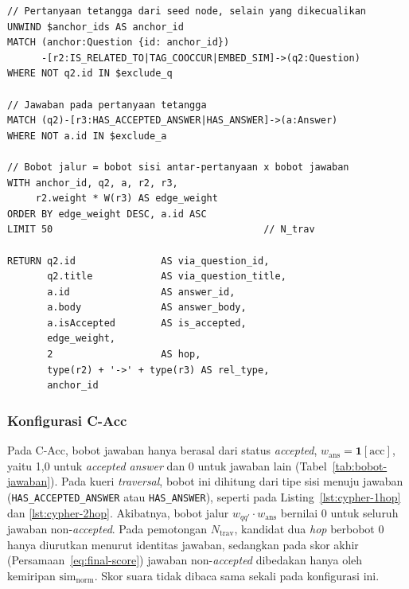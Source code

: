 \begin{lstlisting}[caption={Kueri Cypher \emph{traversal} dua \emph{hop} pada Kondisi C. Bobot jalur adalah bobot sisi antar-pertanyaan dikalikan bobot jawaban \texttt{W(r3)}.}, label={lst:cypher-2hop}, frame=single, captionpos=t, language={}, basicstyle=\ttfamily\scriptsize]
// Pertanyaan tetangga dari seed node, selain yang dikecualikan
UNWIND $anchor_ids AS anchor_id
MATCH (anchor:Question {id: anchor_id})
      -[r2:IS_RELATED_TO|TAG_COOCCUR|EMBED_SIM]->(q2:Question)
WHERE NOT q2.id IN $exclude_q

// Jawaban pada pertanyaan tetangga
MATCH (q2)-[r3:HAS_ACCEPTED_ANSWER|HAS_ANSWER]->(a:Answer)
WHERE NOT a.id IN $exclude_a

// Bobot jalur = bobot sisi antar-pertanyaan x bobot jawaban
WITH anchor_id, q2, a, r2, r3,
     r2.weight * W(r3) AS edge_weight
ORDER BY edge_weight DESC, a.id ASC
LIMIT 50                                     // N_trav

RETURN q2.id               AS via_question_id,
       q2.title            AS via_question_title,
       a.id                AS answer_id,
       a.body              AS answer_body,
       a.isAccepted        AS is_accepted,
       edge_weight,
       2                   AS hop,
       type(r2) + '->' + type(r3) AS rel_type,
       anchor_id
\end{lstlisting}

\subsubsection{Konfigurasi C-Acc}
\label{subsubsec:implementasi-c-acc}

Pada C-Acc, bobot jawaban hanya berasal dari status \emph{accepted}, $w_{\mathrm{ans}}=\mathbf{1}[\mathrm{acc}]$, yaitu 1,0 untuk \emph{accepted answer} dan 0 untuk jawaban lain (Tabel~\ref{tab:bobot-jawaban}). Pada kueri \emph{traversal}, bobot ini dihitung dari tipe sisi menuju jawaban (\texttt{HAS\_ACCEPTED\_ANSWER} atau \texttt{HAS\_ANSWER}), seperti pada Listing~\ref{lst:cypher-1hop} dan \ref{lst:cypher-2hop}. Akibatnya, bobot jalur $w_{qq'}\cdot w_{\mathrm{ans}}$ bernilai 0 untuk seluruh jawaban non-\emph{accepted}. Pada pemotongan $N_{\mathrm{trav}}$, kandidat dua \emph{hop} berbobot 0 hanya diurutkan menurut identitas jawaban, sedangkan pada skor akhir (Persamaan~\eqref{eq:final-score}) jawaban non-\emph{accepted} dibedakan hanya oleh kemiripan $\mathrm{sim}_{\mathrm{norm}}$. Skor suara tidak dibaca sama sekali pada konfigurasi ini.

